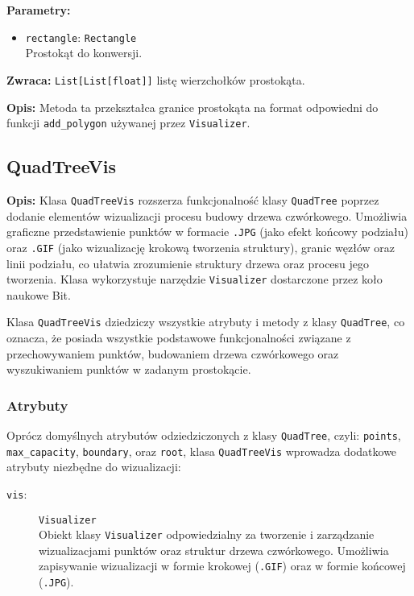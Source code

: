 \documentclass[12pt]{article}
\begin{document}
\noindent\textbf{Parametry:}
\begin{itemize}
    \item \texttt{rectangle}: \texttt{Rectangle} \\
    Prostokąt do konwersji.
\end{itemize}

\textbf{Zwraca:} 
\texttt{List[List[float]]} listę wierzchołków prostokąta.

\textbf{Opis:} 
Metoda ta przekształca granice prostokąta na format odpowiedni do funkcji \texttt{add\_polygon} używanej przez \texttt{Visualizer}.

\subsection{QuadTreeVis}

\textbf{Opis:} Klasa \texttt{QuadTreeVis} rozszerza funkcjonalność klasy \texttt{QuadTree} poprzez dodanie elementów wizualizacji procesu budowy drzewa czwórkowego. Umożliwia graficzne przedstawienie punktów w formacie \texttt{.JPG} (jako efekt końcowy podziału) oraz \texttt{.GIF} (jako wizualizację krokową tworzenia struktury), granic węzłów oraz linii podziału, co ułatwia zrozumienie struktury drzewa oraz procesu jego tworzenia. Klasa wykorzystuje narzędzie \texttt{Visualizer} dostarczone przez koło naukowe Bit.

\noindent Klasa \texttt{QuadTreeVis} dziedziczy wszystkie atrybuty i metody z klasy \texttt{QuadTree}, co oznacza, że posiada wszystkie podstawowe funkcjonalności związane z przechowywaniem punktów, budowaniem drzewa czwórkowego oraz wyszukiwaniem punktów w zadanym prostokącie.

\subsubsection{Atrybuty}
Oprócz domyślnych atrybutów odziedziczonych z klasy \texttt{QuadTree}, czyli: \texttt{points}, \texttt{max\_capacity}, \texttt{boundary}, oraz \texttt{root}, klasa \texttt{QuadTreeVis} wprowadza dodatkowe atrybuty niezbędne do wizualizacji:
\begin{description}
    \item[\texttt{vis}:] \texttt{Visualizer} \\
    Obiekt klasy \texttt{Visualizer} odpowiedzialny za tworzenie i zarządzanie wizualizacjami punktów oraz struktur drzewa czwórkowego. Umożliwia zapisywanie wizualizacji w formie krokowej (\texttt{.GIF}) oraz w formie końcowej (\texttt{.JPG}).
\end{description}
\end{document}

